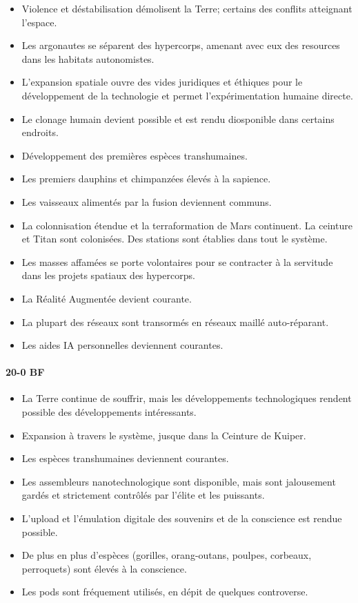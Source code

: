 \documentclass[a4paper,9pt]{article}
\begin{document}
\begin{multicols}{3}
\begin{itemize} 
   \item Violence et déstabilisation démolisent la Terre; certains des conflits
      atteignant l'espace. 
   \item Les argonautes se séparent des hypercorps, amenant avec eux des
      resources dans les habitats autonomistes. 
   \item L'expansion spatiale ouvre des vides juridiques et éthiques pour le
      développement de la technologie et permet l'expérimentation humaine
      directe. 
   \item Le clonage humain devient possible et est rendu diosponible dans
      certains endroits. 
   \item Développement des premières espèces transhumaines. 
   \item Les premiers dauphins et chimpanzées élevés à la sapience. 
   \item Les vaisseaux alimentés par la fusion deviennent communs. 
   \item La colonnisation étendue et la terraformation de Mars continuent. La
      ceinture et Titan sont colonisées. Des stations sont établies dans tout
      le système. 
   \item Les masses affamées se porte volontaires pour se contracter à la
      servitude dans les projets spatiaux des hypercorps. 
   \item La Réalité Augmentée devient courante. 
   \item La plupart des réseaux sont transormés en réseaux maillé auto-réparant. 
   \item Les aides IA personnelles deviennent courantes.
\end{itemize} 

\paragraph{20-0 BF} 

\begin{itemize} 
   \item La Terre continue de souffrir, mais les développements technologiques
      rendent possible des développements intéressants. 
   \item Expansion à travers le système, jusque dans la Ceinture de Kuiper. 
   \item Les espèces transhumaines deviennent courantes. 
   \item Les assembleurs nanotechnologique sont disponible, mais sont
      jalousement gardés et strictement contrôlés par l'élite et les puissants. 
   \item L'upload et l'émulation digitale des souvenirs et de la conscience est
      rendue possible. 
   \item De plus en plus d'espèces (gorilles, orang-outans, poulpes, corbeaux,
      perroquets) sont élevés à la conscience. 
   \item Les pods sont fréquement utilisés, en dépit de quelques controverse.
\end{itemize} 


\end{multicols}
\end{document}
